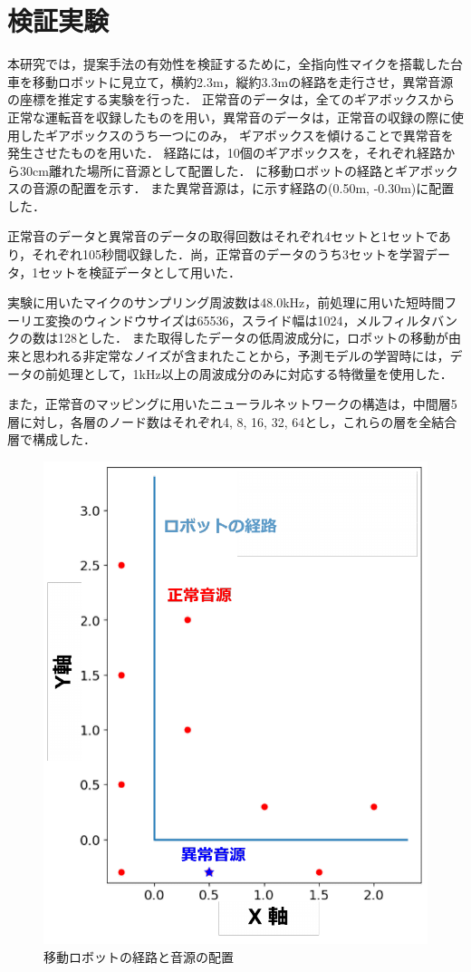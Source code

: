 \documentclass[../main]{subfiles}
\begin{document}
\graphicspath{{../figures/}}

\section{検証実験}
本研究では，提案手法の有効性を検証するために，全指向性マイクを搭載した台車を移動ロボットに見立て，横約2.3m，縦約3.3mの経路を走行させ，異常音源の座標を推定する実験を行った．
正常音のデータは，全てのギアボックスから正常な運転音を収録したものを用い，異常音のデータは，正常音の収録の際に使用したギアボックスのうち一つにのみ，
ギアボックスを傾けることで異常音を発生させたものを用いた．
経路には，10個のギアボックスを，それぞれ経路から30cm離れた場所に音源として配置した．
に移動ロボットの経路とギアボックスの音源の配置を示す．
また異常音源は，に示す経路の(0.50m, -0.30m)に配置した．


正常音のデータと異常音のデータの取得回数はそれぞれ4セットと1セットであり，それぞれ105秒間収録した．尚，正常音のデータのうち3セットを学習データ，1セットを検証データとして用いた．


実験に用いたマイクのサンプリング周波数は48.0kHz，前処理に用いた短時間フーリエ変換のウィンドウサイズは65536，スライド幅は1024，メルフィルタバンクの数は128とした．
また取得したデータの低周波成分に，ロボットの移動が由来と思われる非定常なノイズが含まれたことから，予測モデルの学習時には，データの前処理として，1kHz以上の周波成分のみに対応する特徴量を使用した．

また，正常音のマッピングに用いたニューラルネットワークの構造は，中間層5層に対し，各層のノード数はそれぞれ4, 8, 16, 32, 64とし，これらの層を全結合層で構成した．

\begin{figure}[tb]
  \centering
  \includegraphics[keepaspectratio, width=0.8\linewidth]{route.pdf}
  \caption{移動ロボットの経路と音源の配置}
\end{figure}
\end{document}
